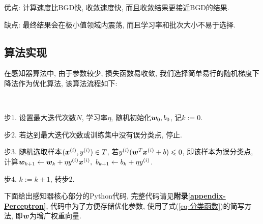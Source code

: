 \documentclass[12pt, a4paper, oneside]{ctexart}
\begin{document}
优点: 计算速度比BGD快, 收敛速度快, 而且收敛结果更接近BGD的结果.

缺点: 最终结果会在极小值领域内震荡, 而且学习率和批次大小不易于选择.

\subsection{算法实现}

在感知器算法中, 由于参数较少, 损失函数易收敛, 我们选择简单易行的随机梯度下降法作为优化算法, 该算法流程如下: 

\begin{algorithm}[感知器参数学习算法]\label{algorithm-感知器}\ 

步1. 设置最大迭代次数$N$, 学习率$\eta$, 随机初始化$\boldsymbol{w}_0,  b_0$, 记$k:= 0$.

步2. 若达到最大迭代次数或训练集中没有误分类点, 停止.

步3. 随机选取样本$(\boldsymbol{x}^{(i)},  y^{(i)})\in T$, 若$y^{(i)}(\boldsymbol{w}^T\boldsymbol{x}^{(i)}+b)\leqslant 0$, 即该样本为误分类点, 计算$\boldsymbol{w}_{k+1}\leftarrow \boldsymbol{w}_{k} + \eta y^{(i)}\boldsymbol{x}^{(i)}, \ b_{k+1}\leftarrow b_{k} + \eta y^{(i)}$.

步4. $k:= k+1$, 转步2.

\end{algorithm}

下面给出感知器核心部分的Python代码, 完整代码请见\textbf{附录\ref{appendix-Perceptron}}, 代码中为了方便存储优化参数, 使用了式(\ref{eq-分类函数})的简写方法, 即$\boldsymbol{w}$为增广权重向量.

\end{document}
